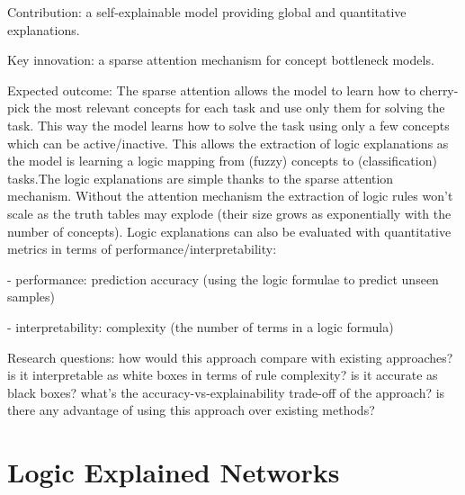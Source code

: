 Contribution: a self-explainable model providing global and quantitative explanations.

Key innovation: a sparse attention mechanism for concept bottleneck models.

Expected outcome: The sparse attention allows the model to learn how to cherry-pick the most relevant concepts for each task and use only them for solving the task. This way the model learns how to solve the task using only a few concepts which can be active/inactive. This allows the extraction of logic explanations as the model is learning a logic mapping from (fuzzy) concepts to (classification) tasks.The logic explanations are simple thanks to the sparse attention mechanism. Without the attention mechanism the extraction of logic rules won't scale as the truth tables may explode (their size grows as exponentially with the number of concepts). Logic explanations can also be evaluated with quantitative metrics in terms of performance/interpretability: 

- performance: prediction accuracy (using the logic formulae to predict unseen samples)

- interpretability: complexity (the number of terms in a logic formula)

Research questions: how would this approach compare with existing approaches? is it interpretable as white boxes in terms of rule complexity? is it accurate as black boxes? what's the accuracy-vs-explainability trade-off of the approach? is there any advantage of using this approach over existing methods?


\section{Logic Explained Networks}

